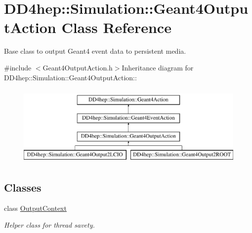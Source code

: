 \hypertarget{class_d_d4hep_1_1_simulation_1_1_geant4_output_action}{
\section{DD4hep::Simulation::Geant4OutputAction Class Reference}
\label{class_d_d4hep_1_1_simulation_1_1_geant4_output_action}
}


Base class to output Geant4 event data to persistent media.  


{\ttfamily \#include $<$Geant4OutputAction.h$>$}Inheritance diagram for DD4hep::Simulation::Geant4OutputAction::\begin{figure}[H]
\begin{center}
\leavevmode
\includegraphics[height=4cm]{class_d_d4hep_1_1_simulation_1_1_geant4_output_action}
\end{center}
\end{figure}
\subsection*{Classes}
\begin{DoxyCompactItemize}
\item 
class \hyperlink{class_d_d4hep_1_1_simulation_1_1_geant4_output_action_1_1_output_context}{OutputContext}
\begin{DoxyCompactList}\small\item\em Helper class for thread savety. \item\end{DoxyCompactList}\end{DoxyCompactItemize}
